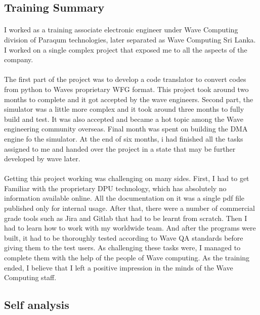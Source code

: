 \subsection{Training Summary}
\paragraph{}
I worked as a training associate electronic engineer under Wave Computing division of Paraqum technologies, later separated as Wave Computing Sri Lanka. I worked on a single complex project that exposed me to all the aspects of the company.

\paragraph{}
The first part of the project was to develop a code translator to convert codes from python to Waves proprietary WFG format. This project took around two months to complete and it got accepted by the wave engineers. Second part, the simulator was a little more complex and it took around three months to fully build and test. It was also accepted and became a hot topic among the Wave engineering community overseas. Final month was spent on building the DMA engine fo the simulator. At the end of six months, i had finished all the tasks assigned to me and handed over the project in a state that may be further developed by wave later.

\paragraph{}
Getting this project working was challenging on many sides. First, I had to get Familiar with the proprietary DPU technology, which has absolutely no information available online. All the documentation on it was a single pdf file published only for internal usage. After that, there were a number of commercial grade tools such as Jira and Gitlab that had to be learnt from scratch. Then I had to learn how to work with my worldwide team. And after the programs were built, it had to be thoroughly tested according to Wave QA standards before giving them to the test users. As challenging these tasks were, I managed to complete them with the help of the people of Wave computing. As the training ended, I believe that I left a positive impression in the minds of the Wave Computing staff.

\subsection{Self analysis}
